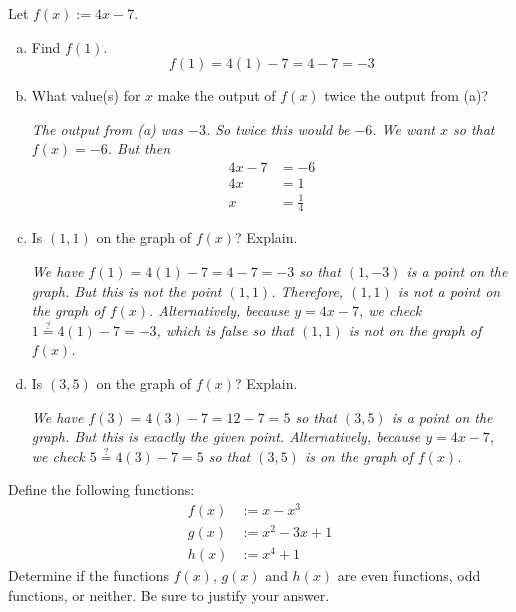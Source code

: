 \documentclass[11pt,letterpaper]{article}
\begin{document}
 Let $f(x):= 4x - 7$.
\begin{enumerate}[(a)]
\item Find $f(1)$. \pvspace{1.3cm}
	\[
	f(1)= 4(1) - 7= 4 - 7= -3
	\] \pvspace{2.1cm}


\item What value(s) for $x$ make the output of $f(x)$ twice the output from (a)? \pspace

{\itshape The output from (a) was $-3$. So twice this would be $-6$. We want $x$ so that $f(x)= -6$. But then 
	\[
	\begin{aligned}
	4x - 7&= -6 \\
	4x&= 1 \\
	x&= \frac{1}{4}
	\end{aligned}
	\]
} \pvspace{0.7cm}


\item Is $(1, 1)$ on the graph of $f(x)$? Explain. \pspace

{\itshape We have $f(1)= 4(1) - 7= 4 - 7= -3$ so that $(1, -3)$ is a point on the graph. But this is not the point $(1, 1)$. Therefore, $(1, 1)$ is not a point on the graph of $f(x)$. Alternatively, because $y= 4x - 7$, we check $1 \stackrel{?}{=} 4(1) - 7= -3$, which is false so that $(1, 1)$ is not on the graph of $f(x)$.} \pvspace{2.5cm}


\item Is $(3, 5)$ on the graph of $f(x)$? Explain. \pspace

{\itshape We have $f(3)= 4(3) - 7= 12 - 7= 5$ so that $(3, 5)$ is a point on the graph. But this is exactly the given point. Alternatively, because $y= 4x - 7$, we check $5 \stackrel{?}{=} 4(3) - 7= 5$ so that $(3, 5)$ is on the graph of $f(x)$.}
\end{enumerate}





\newpage





 Define the following functions:
	\[
	\begin{aligned}
	f(x)&:= x - x^3 \\
	g(x)&:= x^2 - 3x + 1 \\
	h(x)&:= x^4 + 1
	\end{aligned}
	\]
Determine if the functions $f(x)$, $g(x)$ and $h(x)$ are even functions, odd functions, or neither. Be sure to justify your answer. \pspace
\end{document}
